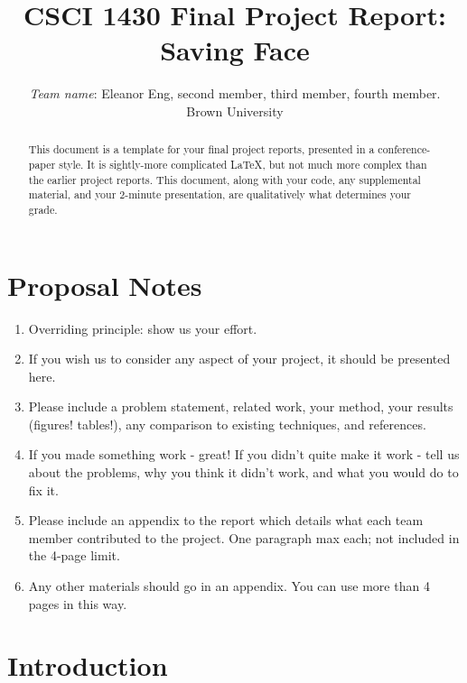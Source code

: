 \documentclass[10pt,twocolumn,letterpaper]{article}
\begin{document}
\title{CSCI 1430 Final Project Report:\\Saving Face}

\author{\emph{Team name}: Eleanor Eng, second member, third member, fourth member.\\
Brown University\\
}

\maketitle

\begin{abstract}
This document is a template for your final project reports, presented in a conference-paper style. It is sightly-more complicated LaTeX, but not much more complex than the earlier project reports. This document, along with your code, any supplemental material, and your 2-minute presentation, are qualitatively what determines your grade. 
\end{abstract}


\section{Proposal Notes}

\begin{enumerate}
    \item Overriding principle: show us your effort.
    \item If you wish us to consider any aspect of your project, it should be presented here. \item Please include a problem statement, related work, your method, your results (figures! tables!), any comparison to existing techniques, and references. 
    \item If you made something work - great! If you didn't quite make it work - tell us about the problems, why you think it didn't work, and what you would do to fix it.
    \item Please include an appendix to the report which details what each team member contributed to the project. One paragraph max each; not included in the 4-page limit.
    \item Any other materials should go in an appendix. You can use more than 4 pages in this way.
\end{enumerate}


\section{Introduction}
\end{document}
